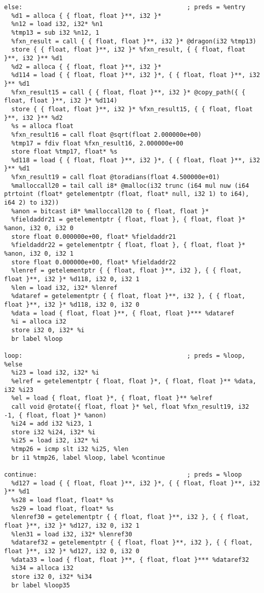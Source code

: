 \documentclass[main.tex]{subfiles}
\begin{document}
{\begin{lstlisting}
else:                                             ; preds = %entry
  %d1 = alloca { { float, float }**, i32 }*
  %n12 = load i32, i32* %n1
  %tmp13 = sub i32 %n12, 1
  %fxn_result = call { { float, float }**, i32 }* @dragon(i32 %tmp13)
  store { { float, float }**, i32 }* %fxn_result, { { float, float }**, i32 }** %d1
  %d2 = alloca { { float, float }**, i32 }*
  %d114 = load { { float, float }**, i32 }*, { { float, float }**, i32 }** %d1
  %fxn_result15 = call { { float, float }**, i32 }* @copy_path({ { float, float }**, i32 }* %d114)
  store { { float, float }**, i32 }* %fxn_result15, { { float, float }**, i32 }** %d2
  %s = alloca float
  %fxn_result16 = call float @sqrt(float 2.000000e+00)
  %tmp17 = fdiv float %fxn_result16, 2.000000e+00
  store float %tmp17, float* %s
  %d118 = load { { float, float }**, i32 }*, { { float, float }**, i32 }** %d1
  %fxn_result19 = call float @toradians(float 4.500000e+01)
  %malloccall20 = tail call i8* @malloc(i32 trunc (i64 mul nuw (i64 ptrtoint (float* getelementptr (float, float* null, i32 1) to i64), i64 2) to i32))
  %anon = bitcast i8* %malloccall20 to { float, float }*
  %fieldaddr21 = getelementptr { float, float }, { float, float }* %anon, i32 0, i32 0
  store float 0.000000e+00, float* %fieldaddr21
  %fieldaddr22 = getelementptr { float, float }, { float, float }* %anon, i32 0, i32 1
  store float 0.000000e+00, float* %fieldaddr22
  %lenref = getelementptr { { float, float }**, i32 }, { { float, float }**, i32 }* %d118, i32 0, i32 1
  %len = load i32, i32* %lenref
  %dataref = getelementptr { { float, float }**, i32 }, { { float, float }**, i32 }* %d118, i32 0, i32 0
  %data = load { float, float }**, { float, float }*** %dataref
  %i = alloca i32
  store i32 0, i32* %i
  br label %loop

loop:                                             ; preds = %loop, %else
  %i23 = load i32, i32* %i
  %elref = getelementptr { float, float }*, { float, float }** %data, i32 %i23
  %el = load { float, float }*, { float, float }** %elref
  call void @rotate({ float, float }* %el, float %fxn_result19, i32 -1, { float, float }* %anon)
  %i24 = add i32 %i23, 1
  store i32 %i24, i32* %i
  %i25 = load i32, i32* %i
  %tmp26 = icmp slt i32 %i25, %len
  br i1 %tmp26, label %loop, label %continue

continue:                                         ; preds = %loop
  %d127 = load { { float, float }**, i32 }*, { { float, float }**, i32 }** %d1
  %s28 = load float, float* %s
  %s29 = load float, float* %s
  %lenref30 = getelementptr { { float, float }**, i32 }, { { float, float }**, i32 }* %d127, i32 0, i32 1
  %len31 = load i32, i32* %lenref30
  %dataref32 = getelementptr { { float, float }**, i32 }, { { float, float }**, i32 }* %d127, i32 0, i32 0
  %data33 = load { float, float }**, { float, float }*** %dataref32
  %i34 = alloca i32
  store i32 0, i32* %i34
  br label %loop35


\end{lstlisting}}
\end{document}
